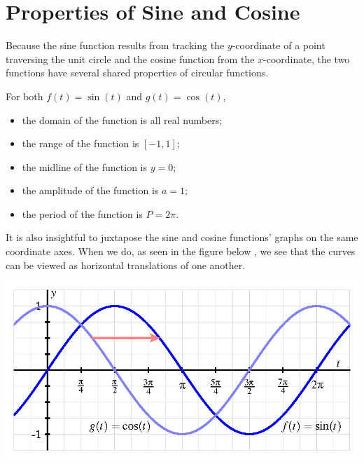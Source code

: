 \documentclass[nooutcomes]{ximera}
\begin{document}
\begin{center}  
\end{center} 


\section{Properties of Sine and Cosine}
Because the sine function results from tracking the \(y\)-coordinate of a point traversing the unit circle and the cosine function from the \(x\)-coordinate, the two functions have several shared properties of circular functions.

\begin{callout}
For both \(f(t) = \sin(t)\) and \(g(t) = \cos(t)\),%
\begin{itemize}[label=\textbullet]
\item
the domain of the function is all real numbers;%
\item
the range of the function is \([-1,1]\);%
\item
the midline of the function is \(y = 0\);%
\item
the amplitude of the function is \(a = 1\);%
\item
the period of the function is \(P = 2\pi\).%
\end{itemize}
\end{callout}

It is also insightful to juxtapose the sine and cosine functions' graphs on the same coordinate axes.  When we do, as seen in the figure below%
, we see that the curves can be viewed as horizontal translations of one another.%

\begin{image}
\includegraphics{sine-and-cosine-graphs.png}
\end{image}
\end{document}
